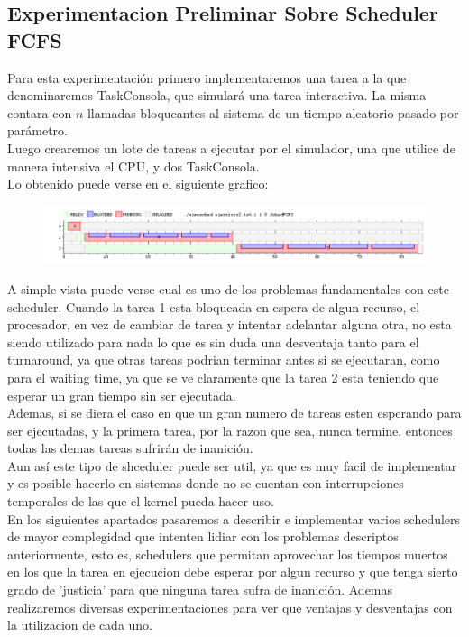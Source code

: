 \subsection{Experimentacion Preliminar Sobre Scheduler FCFS}

Para esta experimentación primero implementaremos una tarea a la que denominaremos TaskConsola, que simulará una tarea interactiva. La misma contara con $n$ llamadas bloqueantes al sistema de un tiempo aleatorio pasado por parámetro.
\\
Luego crearemos un lote de tareas a ejecutar por el simulador, una que utilice de manera intensiva el CPU, y dos TaskConsola.
\\
Lo obtenido puede verse en el siguiente grafico:
\\
\begin{figure}[H]
  \centering
	\includegraphics[scale=0.45]{graficos/parte1/testFCFS.png}
  \caption[Caption for LOF]{}
\end{figure}
A simple vista puede verse cual es uno de los problemas fundamentales con este scheduler. Cuando la tarea 1 esta bloqueada en espera de algun recurso, el procesador, en vez de cambiar de tarea y intentar adelantar alguna otra, no esta siendo utilizado para nada lo que es sin duda una desventaja tanto para el turnaround, ya que otras tareas podrian terminar antes si se ejecutaran, como para el waiting time, ya que se ve claramente que la tarea 2 esta teniendo que esperar un gran tiempo sin ser ejecutada.
\\
Ademas, si se diera el caso en que un gran numero de tareas esten esperando para ser ejecutadas, y la primera tarea, por la razon que sea, nunca termine, entonces todas las demas tareas sufrirán de inanición.
\\
Aun así este tipo de shceduler puede ser util, ya que es muy facil de implementar y es posible hacerlo en sistemas donde no se cuentan con interrupciones temporales de las que el kernel pueda hacer uso.
\\
En los siguientes apartados pasaremos a describir e implementar varios schedulers de mayor complegidad que intenten lidiar con los problemas descriptos anteriormente, esto es, schedulers que permitan aprovechar los tiempos muertos en los que la tarea en ejecucion debe esperar por algun recurso y que tenga sierto grado de 'justicia' para que ninguna tarea sufra de inanición. Ademas realizaremos diversas experimentaciones para ver que ventajas y desventajas con la utilizacion de cada uno.
